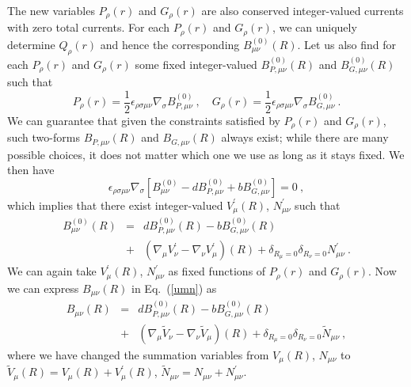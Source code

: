 \documentclass[prb,twocolumn]{revtex4-1}
\def\cQ{{Q}}
\def\cP{{P}}
\def\cG{{G}}
\def\uu{B}
\def\MM{N}
\begin{document}
The new variables $\cP_\rho(r)$ and $\cG_\rho(r)$ are also conserved integer-valued currents with zero total currents.
For each $\cP_\rho(r)$ and $\cG_\rho(r)$, we can uniquely determine $\cQ_\rho(r)$ and hence the corresponding $\uu_{\mu\nu}^{(0)}(R)$.  Let us also find for each $\cP_\rho(r)$ and $\cG_\rho(r)$ some fixed integer-valued $\uu_{P, \mu\nu}^{(0)}(R)$ and $\uu_{G, \mu\nu}^{(0)}(R)$ such that
\begin{equation}
\cP_\rho(r) = \frac{1}{2} \epsilon_{\rho\sigma\mu\nu} \nabla_\sigma \uu_{P, \mu\nu}^{(0)} ~, \quad 
\cG_\rho(r) = \frac{1}{2} \epsilon_{\rho\sigma\mu\nu} \nabla_\sigma \uu_{G, \mu\nu}^{(0)} ~.
\label{uPuG}
\end{equation}
We can guarantee that given the constraints satisfied by $\cP_\rho(r)$ and $\cG_\rho(r)$, such two-forms $\uu_{P, \mu\nu}(R)$ and $\uu_{G, \mu\nu}(R)$ always exist; while there are many possible choices, it does not matter which one we use as long as it stays fixed. 
We then have
\begin{equation}
\epsilon_{\rho\sigma\mu\nu} \nabla_\sigma \left[\uu_{\mu\nu}^{(0)} - d \uu_{P, \mu\nu}^{(0)} + b \uu_{G, \mu\nu}^{(0)} \right] = 0 ~,
\end{equation}
which implies that there exist integer-valued $V^\prime_\mu(R)$, $\MM^\prime_{\mu\nu}$ such that
\begin{eqnarray}
\uu_{\mu\nu}^{(0)}(R) &=& d \uu_{P, \mu\nu}^{(0)}(R) - b \uu_{G, \mu\nu}^{(0)}(R) \\
&+& (\nabla_\mu V^\prime_\nu - \nabla_\nu V^\prime_\mu)(R) + \delta_{R_\mu = 0} \delta_{R_\nu = 0} \MM^\prime_{\mu\nu} ~.\nonumber
\end{eqnarray}
We can again take $V^\prime_\mu(R)$, $\MM^\prime_{\mu\nu}$ as fixed functions of $\cP_\rho(r)$ and $\cG_\rho(r)$.  Now we can express $\uu_{\mu\nu}(R)$ in Eq.~(\ref{umn}) as
\begin{eqnarray}
\uu_{\mu\nu}(R) &=&  d \uu_{P, \mu\nu}^{(0)}(R) - b \uu_{G, \mu\nu}^{(0)}(R) \\
&+& (\nabla_\mu \tilde{V}_\nu - \nabla_\nu \tilde{V}_\mu)(R) + \delta_{R_\mu = 0} \delta_{R_\nu = 0} \tilde{\MM}_{\mu\nu} ~,\nonumber
\end{eqnarray}
where we have changed the summation variables from $V_\mu(R)$, $\MM_{\mu\nu}$ to $\tilde{V}_\mu(R) = V_\mu(R) + V^\prime_\mu(R)$, $\tilde{\MM}_{\mu\nu} = \MM_{\mu\nu} + \MM^\prime_{\mu\nu}$.
\end{document}
